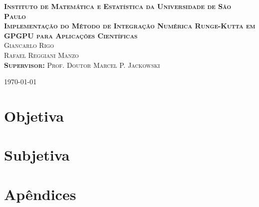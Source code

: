 \documentclass[brazil,a4paper,11pt]{book}
\begin{document}
\begin{titlepage}
  \begin{center}
  \textsc{{\small \textbf{Instituto de Matemática e Estatística da Universidade de São Paulo}}}
  \\[6cm]
  \textsc{{\large \textbf{Implementação do Método de Integração Numérica Runge-Kutta em GPGPU para Aplicações Científicas}}}
  \\[2cm]
  \textsc{Giancarlo Rigo\\
          Rafael Reggiani Manzo\\
          \textbf{Supervisor:} Prof. Doutor Marcel P. Jackowski}
  
  \vfill
  \today
  \end{center}
\end{titlepage}

\tableofcontents

\part{Objetiva}







\part{Subjetiva}



\part{Apêndices}
\begin{appendix}


\end{appendix}
\end{document}
